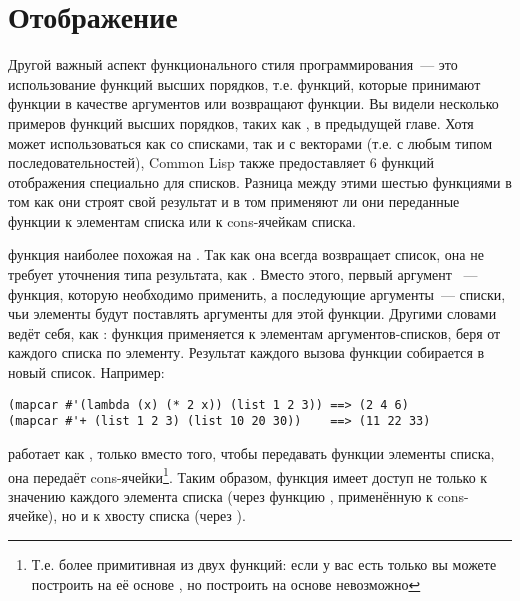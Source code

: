 \section{Отображение}
\label{sec:12-map}

Другой важный аспект функционального стиля программирования~--- это использование функций
высших порядков, т.е. функций, которые принимают функции в качестве аргументов или
возвращают функции. Вы видели несколько примеров функций высших порядков, таких как
, в предыдущей главе. Хотя  может использоваться как со списками, так
и с векторами (т.е. с любым типом последовательностей), Common Lisp также предоставляет 6
функций отображения специально для списков. Разница между этими шестью функциями в том как
они строят свой результат и в том применяют ли они переданные функции к элементам списка
или к cons-ячейкам списка.

 функция наиболее похожая на . Так как она всегда возвращает список,
она не требует уточнения типа результата, как . Вместо этого, первый аргумент
~--- функция, которую необходимо применить, а последующие аргументы~--- списки,
чьи элементы будут поставлять аргументы для этой функции. Другими словами 
ведёт себя, как : функция применяется к элементам аргументов-списков, беря от
каждого списка по элементу. Результат каждого вызова функции собирается в новый
список. Например:

\begin{lstlisting}
(mapcar #'(lambda (x) (* 2 x)) (list 1 2 3)) ==> (2 4 6)
(mapcar #'+ (list 1 2 3) (list 10 20 30))    ==> (11 22 33)
\end{lstlisting}

 работает как , только вместо того, чтобы передавать функции
элементы списка, она передаёт cons-ячейки\footnote{Т.е.  более примитивная
  из двух функций: если у вас есть только  вы можете построить на её основе
  , но построить  на основе  невозможно}.  Таким
образом, функция имеет доступ не только к значению каждого элемента списка (через функцию
, применённую к cons-ячейке), но и к хвосту списка (через ).

